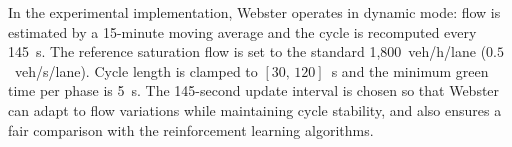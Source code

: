 In the experimental implementation, Webster operates in dynamic mode: flow is
estimated by a 15-minute moving average and the cycle is recomputed every
145~s. The reference saturation flow is set to the standard 1{,}800~veh/h/lane
($0.5$~veh/s/lane). Cycle length is clamped to $[30,\,120]$~s and the minimum
green time per phase is 5~s. The 145-second update interval is chosen so that
Webster can adapt to flow variations while maintaining cycle stability, and also
ensures a fair comparison with the reinforcement learning algorithms.




%
%
%
%
%
%
